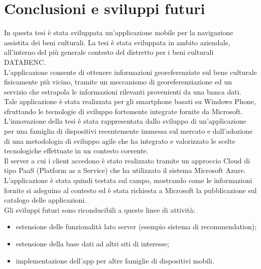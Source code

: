 
\chapter*{Conclusioni e sviluppi futuri}
\label{ref:conclusioni}  
In questa tesi è stata sviluppata un'applicazione mobile per la navigazione assistita dei beni culturali.
La tesi è stata sviluppata in ambito aziendale, all'interno del più generale contesto del distretto per i beni culturali DATABENC.\\
L'applicazione consente di ottenere informazioni georeferenziate sul bene culturale fisicamente più vicino, tramite un meccanismo di georeferenziazione ed un servizio che estrapola le informazioni rilevanti provenienti da una banca dati.\\
Tale applicazione è stata realizzata per gli smartphone basati su Windows Phone, sfruttando le tecnologie di sviluppo fortemente integrate fornite da Microsoft. 
L'innovazione della tesi è stata rappresentata dallo sviluppo di un'applicazione per una famiglia di dispositivi recentemente immessa sul mercato e dall'adozione di una metodologia di sviluppo agile che ha integrato e valorizzato le scelte tecnologiche effettuate in un contesto coerente.\\
Il server a cui i client accedono è stato realizzato tramite un approccio Cloud di tipo PaaS (Platform as a Service) che ha utilizzato il sistema Microsoft Azure.
L'applicazione è stata quindi testata sul campo, mostrando come le informazioni fornite si adeguino al contesto ed è stata richiesta a Microsoft la pubblicazione sul catalogo delle applicazioni.\\

Gli sviluppi futuri sono riconducibili a queste linee di attività:
\begin{itemize}
\item estensione delle funzionalità lato server (esempio sistema di recommendation);
\item estensione della base dati ad altri siti di interesse;
\item implementazione dell'app per altre famiglie di dispositivi mobili.
\end{itemize}


\clearpage{\pagestyle{empty}\cleardoublepage}
